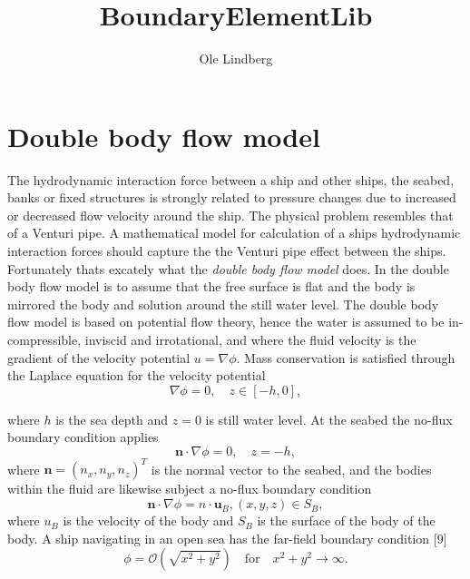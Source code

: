 \documentclass[]{book}
\title{BoundaryElementLib}
\author{Ole Lindberg}
\newcommand{\V}[1]{\boldsymbol{#1}}
\begin{document}
\maketitle

\chapter{Double body flow model}
The hydrodynamic interaction force between a ship and other ships, the seabed, banks or fixed structures is strongly related to pressure changes due to increased or decreased flow velocity around the ship. The physical problem resembles that of a Venturi pipe. A mathematical model for calculation of a ships hydrodynamic interaction forces should capture the the Venturi pipe effect between the ships. Fortunately thats excately what the \emph{double body flow model} does. In the double body flow model is to assume that the free surface is flat and the body is mirrored the body and solution around
the still water level.
The double body flow model is based on potential flow theory, hence the water is assumed to be in-
compressible, inviscid and irrotational, and where the fluid velocity is the gradient of the velocity potential $u = \nabla \phi$. 
Mass conservation is satisfied through the Laplace equation for the velocity potential
\begin{equation}
	\nabla \phi = 0, \quad z \in [-h,0],
\end{equation}

where $h$ is the sea depth and $z = 0$ is still water level. At the seabed the no-flux boundary condition applies
\begin{equation}
\V{n} \cdot \nabla \phi = 0, \quad z = -h, 
\end{equation}
where $\V{n} = (n_x, n_y, n_z)^T$ is the normal vector to the seabed, and the bodies within the fluid are likewise
subject a no-flux boundary condition
\begin{equation}
\V{n} \cdot \nabla \phi = n \cdot \V{u}_B, (x, y, z) \in S_B, 
\end{equation}
where $u_B$ is the velocity of the body and $S_B$ is the surface of the body of the body. A ship navigating in an
open sea has the far-field boundary condition [9]
\begin{equation}
\phi = \mathcal{O} (\sqrt{x^2 + y^2}) \quad \mathrm{for} \quad x^2 + y^2 \rightarrow \infty. 
\end{equation}
\end{document}
